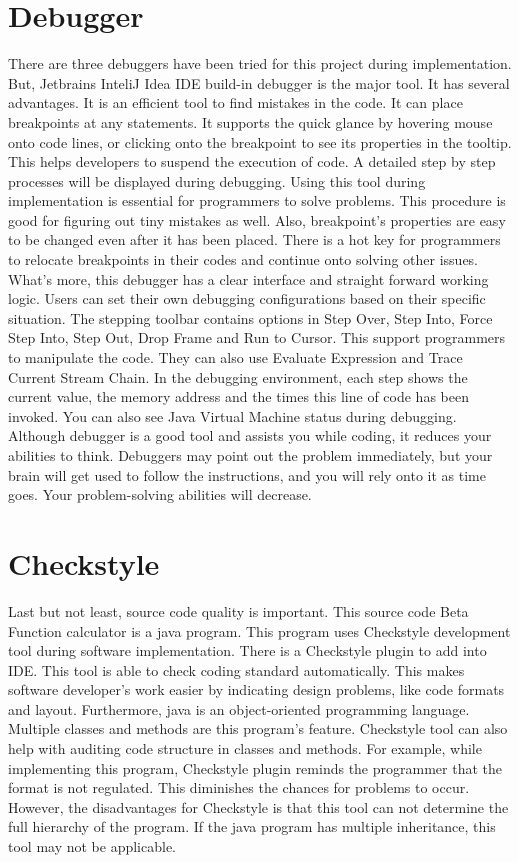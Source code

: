 \documentclass{article}
\begin{document}
\section{Debugger}



There are three debuggers have been tried for this project during implementation. But, Jetbrains InteliJ Idea IDE build-in debugger is the major tool. It has several advantages. It is an efficient tool to find mistakes in the code. It can place breakpoints at any statements. It supports the quick glance by hovering mouse onto code lines, or clicking onto the breakpoint to see its properties in the tooltip. This helps developers to suspend the execution of code. A detailed step by step processes will be displayed during debugging. Using this tool during implementation is essential for programmers to solve problems. This procedure is good for figuring out tiny mistakes as well. Also, breakpoint’s properties are easy to be changed even after it has been placed. There is a hot key for programmers to relocate breakpoints in their codes and continue onto solving other issues. What’s more, this debugger has a clear interface and straight forward working logic. Users can set their own debugging configurations based on their specific situation. The stepping toolbar contains options in Step Over, Step Into, Force Step Into, Step Out, Drop Frame and Run to Cursor. This support programmers to manipulate the code. They can also use Evaluate Expression and Trace Current Stream Chain. In the debugging environment, each step shows the current value, the memory address and the times this line of code has been invoked. You can also see Java Virtual Machine status during debugging. Although debugger is a good tool and assists you while coding, it reduces your abilities to think. Debuggers may point out the problem immediately, but your brain will get used to follow the instructions, and you will rely onto it as time goes. Your problem-solving abilities will decrease.


\section{Checkstyle}


 
Last but not least, source code quality is important. This source code Beta Function calculator is a java program. This program uses Checkstyle development tool during software implementation. There is a Checkstyle plugin to add into IDE. This tool is able to check coding standard automatically. This makes software developer’s work easier by indicating design problems, like code formats and layout. Furthermore, java is an object-oriented programming language. Multiple classes and methods are this program's feature. Checkstyle tool can also help with auditing code structure in classes and methods. For example, while implementing this program, Checkstyle plugin reminds the programmer that the format is not regulated. This diminishes the chances for problems to occur. However, the disadvantages for Checkstyle is that this tool can not determine the full hierarchy of the program. If the java program has multiple inheritance, this tool may not be applicable.
\end{document}
